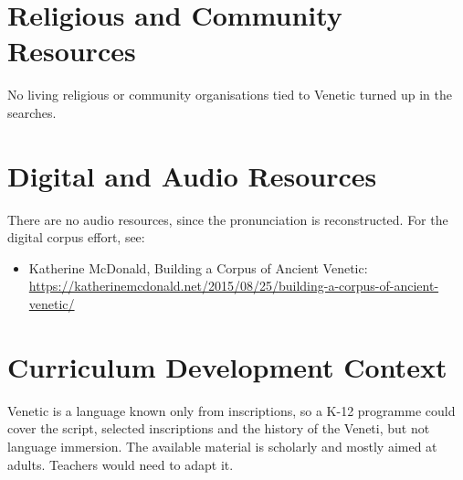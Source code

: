 \documentclass[12pt]{article}
\begin{document}
\section{Religious and Community Resources}
No living religious or community organisations tied to Venetic turned up in the searches.

\section{Digital and Audio Resources}
There are no audio resources, since the pronunciation is reconstructed. For the digital corpus effort, see:
\begin{itemize}
\item Katherine McDonald, Building a Corpus of Ancient Venetic: \url{https://katherinemcdonald.net/2015/08/25/building-a-corpus-of-ancient-venetic/}
\end{itemize}

\section{Curriculum Development Context}
Venetic is a language known only from inscriptions, so a K-12 programme could cover the script, selected inscriptions and the history of the Veneti, but not language immersion. The available material is scholarly and mostly aimed at adults. Teachers would need to adapt it.
\end{document}
